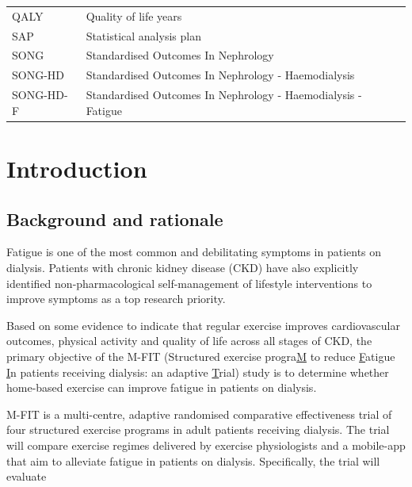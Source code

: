 \documentclass[11pt,parskip=half-]{scrartcl}
\begin{document}
\begin{table}[H]
\begin{tabular}{p{}p{}}
    QALY          & Quality of life years                                                                                            \\
    SAP           & Statistical analysis plan                                                                                        \\
    SONG          & Standardised Outcomes In Nephrology                                                                              \\
    SONG-HD       & Standardised Outcomes In Nephrology - Haemodialysis                                                              \\
    SONG-HD-F     & Standardised Outcomes In Nephrology - Haemodialysis - Fatigue                                                    \\
    \bottomrule
  \end{tabular}
\end{table}

\clearpage

\section{Introduction}
\label{Introduction}


\subsection{Background and rationale}
\label{background}

Fatigue is one of the most common and debilitating symptoms in patients on dialysis. Patients with chronic kidney disease (CKD) have also explicitly identified non-pharmacological self-management of lifestyle interventions to improve symptoms as a top research priority.

Based on some evidence to indicate that regular exercise improves cardiovascular outcomes, physical activity and quality of life across all stages of CKD, the primary objective of the M-FIT (Structured exercise progra\underline{M} to reduce \underline{F}atigue \underline{I}n patients receiving dialysis: an adaptive \underline{T}rial) study is to determine whether home-based exercise can improve fatigue in patients on dialysis.

M-FIT is a multi-centre, adaptive randomised comparative effectiveness trial of four structured exercise programs in adult patients receiving dialysis. The trial will compare exercise regimes delivered by exercise physiologists and a mobile-app that aim to alleviate fatigue in patients on dialysis. Specifically, the trial will evaluate
\end{document}
